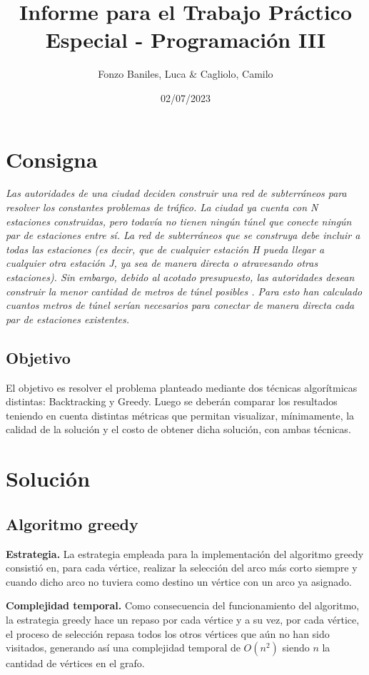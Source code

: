 \documentclass[10 pt, A4paper]{article}
\title{Informe para el Trabajo Práctico Especial - Programación III}
\author{Fonzo Baniles, Luca \& Cagliolo, Camilo}
\date{02/07/2023}
\begin{document}
	\maketitle
	\section*{Consigna}
	\begin{displayquote}
		\textit{Las autoridades de una ciudad deciden construir una red de subterráneos para resolver los constantes problemas de tráfico. La ciudad ya cuenta con N estaciones construidas, pero todavía no tienen ningún túnel que conecte ningún par de estaciones entre sí. La red de subterráneos que se construya debe incluir a todas las estaciones (es decir, que de cualquier estación H pueda llegar a cualquier otra estación J, ya sea de manera directa o atravesando otras estaciones). Sin embargo, debido al acotado presupuesto, las autoridades desean construir la menor cantidad de metros de túnel posibles . Para esto han calculado cuantos metros de túnel serían necesarios para conectar de manera directa cada par de estaciones existentes.}
	\end{displayquote}
	\subsection*{Objetivo}
	El objetivo es resolver el problema planteado mediante dos técnicas algorítmicas distintas: Backtracking y Greedy. Luego se deberán comparar los resultados teniendo en cuenta distintas métricas que permitan visualizar, mínimamente, la calidad de la solución y el costo de obtener dicha solución, con ambas técnicas.
	\section*{Solución}
	\subsection*{Algoritmo greedy}
	
	\textbf{Estrategia.} La estrategia empleada para la implementación del algoritmo greedy consistió en, para cada vértice, realizar la selección del arco más corto siempre y cuando dicho arco no tuviera como destino un vértice con un arco ya asignado.
	
	\textbf{Complejidad temporal.} Como consecuencia del funcionamiento del algoritmo, la estrategia greedy hace un repaso por cada vértice y a su vez, por cada vértice, el proceso de selección repasa todos los otros vértices que aún no han sido visitados, generando así una complejidad temporal de $O(n^2)$ siendo $n$ la cantidad de vértices en el grafo.
	
\end{document}
